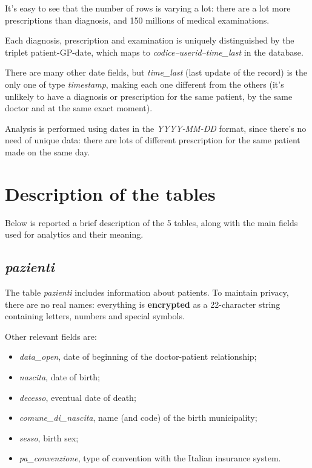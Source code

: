 It's easy to see that the number of rows is varying a lot: there are a lot more prescriptions than diagnosis, and 150 millions of medical examinations. 

Each diagnosis, prescription and examination is uniquely distinguished by the triplet patient-GP-date, which maps to \textit{codice--userid--time\_last} in the database. 

There are many other date fields, but \textit{time\_last} (last update of the record) is the only one of type \textit{timestamp}, making each one different from the others (it's unlikely to have a diagnosis or prescription for the same patient, by the same doctor and at the same exact moment). 

Analysis is performed using dates in the \textit{YYYY-MM-DD} format, since there's no need of unique data: there are lots of different prescription for the same patient made on the same day.

\section{Description of the tables}
Below is reported a brief description of the 5 tables, along with the main fields used for analytics and their meaning.

\subsection{\textit{pazienti}}
The table \textit{pazienti} includes information about patients. To maintain privacy, there are no real names: everything is \textbf{encrypted} as a 22-character string containing letters, numbers and special symbols.

Other relevant fields are:
\begin{itemize}
	\item \textit{data\_open}, date of beginning of the doctor-patient relationship;
	\item \textit{nascita}, date of birth;
	\item \textit{decesso}, eventual date of death;
	\item \textit{comune\_di\_nascita}, name (and code) of the birth municipality;
	\item \textit{sesso}, birth sex;
	\item \textit{pa\_convenzione}, type of convention with the Italian insurance system.
\end{itemize}

